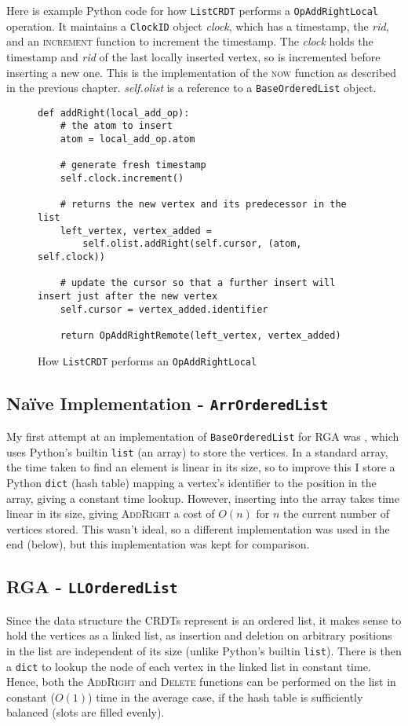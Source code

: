 \documentclass[diss.tex]{subfiles}
\begin{document}
Here is example Python code for how \texttt{ListCRDT} performs a \texttt{OpAddRightLocal} operation. It maintains a \texttt{ClockID} object \textit{clock}, which has a timestamp, the \textit{rid}, and an \textsc{increment} function to increment the timestamp. The \textit{clock} holds the timestamp and \textit{rid} of the last locally inserted vertex, so is incremented before inserting a new one. This is the implementation of the \textsc{now} function as described in the previous chapter. \textit{self.olist} is a reference to a \texttt{BaseOrderedList} object.

\begin{figure}[H]
\begin{lstlisting}
def addRight(local_add_op):
	# the atom to insert
	atom = local_add_op.atom
	
	# generate fresh timestamp
	self.clock.increment()

	# returns the new vertex and its predecessor in the list
	left_vertex, vertex_added = 
		self.olist.addRight(self.cursor, (atom, self.clock))

	# update the cursor so that a further insert will insert just after the new vertex
	self.cursor = vertex_added.identifier

	return OpAddRightRemote(left_vertex, vertex_added)
\end{lstlisting}
\caption{How \texttt{ListCRDT} performs an \texttt{OpAddRightLocal}}
\label{fig:listcrdtaddright}
\end{figure}

\subsection{Na{\"i}ve Implementation - \texttt{ArrOrderedList}}
My first attempt at an implementation of \texttt{BaseOrderedList} for RGA was , which uses Python's builtin \texttt{list} (an array) to store the vertices. In a standard array, the time taken to find an element is linear in its size, so to improve this I store a Python \texttt{dict} (hash table) mapping a vertex's identifier to the position in the array, giving a constant time lookup.  However, inserting into the array takes time linear in its size, giving \textsc{AddRight} a cost of $O(n)$ for $n$ the current number of vertices stored. This wasn't ideal, so a different implementation was used in the end (below), but this implementation was kept for comparison. 

\subsection{RGA - \texttt{LLOrderedList}}
Since the data structure the CRDTs represent is an ordered list, it makes sense to hold the vertices as a linked list, as insertion and deletion on arbitrary positions in the list are independent of its size (unlike Python's builtin \texttt{list}). There is then a \texttt{dict} to lookup the node of each vertex in the linked list in constant time. Hence, both the \textsc{AddRight} and \textsc{Delete} functions can be performed on the list in constant ($O(1)$) time in the average case, if the hash table is sufficiently balanced (slots are filled evenly).
\end{document}
